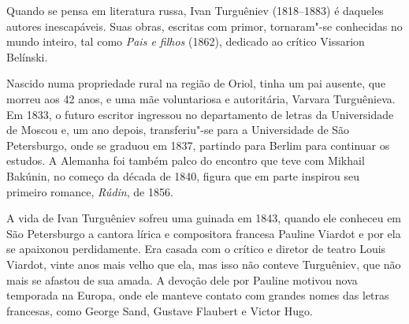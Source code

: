 \noindent{}Quando se pensa em literatura russa, Ivan Turguêniev (1818--1883) é
daqueles autores inescapáveis. Suas obras, escritas com primor,
tornaram"-se conhecidas no mundo inteiro, tal como \emph{Pais e filhos}
(1862), dedicado ao crítico Vissarion Belínski.


Nascido numa propriedade rural na região de Oriol, tinha um pai ausente,
que morreu aos 42 anos, e uma mãe voluntariosa e autoritária, Varvara
Turguênieva. Em 1833, o futuro escritor ingressou no
departamento de letras da Universidade de Moscou e, um ano depois,
transferiu"-se para a Universidade de São Petersburgo, onde se graduou em
1837, partindo para Berlim para continuar os estudos. A Alemanha foi
também palco do encontro que teve com Mikhail Bakúnin, no começo da
década de 1840, figura que em parte inspirou seu primeiro
romance, \emph{Rúdin}, de 1856.

A vida de Ivan Turguêniev sofreu uma guinada em 1843, quando ele
conheceu em São Petersburgo a cantora lírica e compositora francesa
Pauline Viardot e por ela se apaixonou perdidamente. Era casada com o
crítico e diretor de teatro Louis Viardot, vinte anos mais velho que
ela, mas isso não conteve Turguêniev, que não mais se afastou de sua
amada. A devoção dele por Pauline motivou nova temporada na Europa, onde
ele manteve contato com grandes nomes das letras francesas, como George
Sand, Gustave Flaubert e Victor Hugo.

